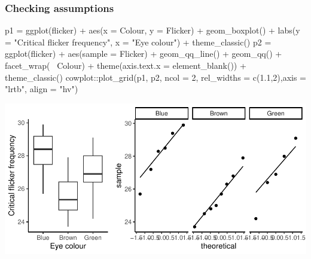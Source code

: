 \documentclass[a4paper]{article}\usepackage[]{graphicx}\usepackage[]{xcolor}
\makeatletter
\def\maxwidth{ %
  \ifdim\Gin@nat@width>\linewidth
    \linewidth
  \else
    \Gin@nat@width
  \fi
}
\makeatother
\begin{document}
\subsubsection{Checking assumptions}
\begin{Schunk}
\begin{Sinput}
p1 = ggplot(flicker) + aes(x = Colour, y = Flicker) + 
  geom_boxplot() + 
  labs(y = "Critical flicker frequency", x = "Eye colour") +
  theme_classic()
p2 = ggplot(flicker) + aes(sample = Flicker) + 
  geom_qq_line() + geom_qq() + facet_wrap(~ Colour) +
  theme(axis.text.x = element_blank()) +
  theme_classic()
cowplot::plot_grid(p1, p2, ncol = 2, rel_widths = c(1.1,2),axis = "lrtb", align = "hv")
\end{Sinput}


{\centering \includegraphics[width=\maxwidth]{figure/listings-unnamed-chunk-238-1} 

}

\end{Schunk}
\end{document}
